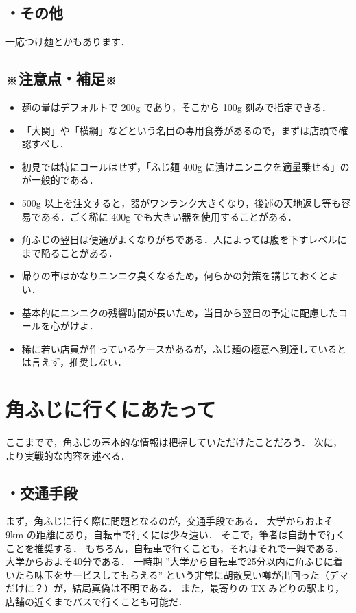 \documentclass[uplatex]{jsarticle}
\begin{document}
  \subsection*{・その他}
  一応つけ麺とかもあります．

  \subsection*{※注意点・補足※}
  \begin{itemize}
   \item 麺の量はデフォルトで 200g であり，そこから 100g 刻みで指定できる．
   \item 「大関」や「横綱」などという名目の専用食券があるので，まずは店頭で確認すべし．
   \item 初見では特にコールはせず，「ふじ麺 400g に漬けニンニクを適量乗せる」のが一般的である．
   \item 500g 以上を注文すると，器がワンランク大きくなり，後述の天地返し等も容易である．ごく稀に 400g でも大きい器を使用することがある．
   \item 角ふじの翌日は便通がよくなりがちである．人によっては腹を下すレベルにまで陥ることがある．
   \item 帰りの車はかなりニンニク臭くなるため，何らかの対策を講じておくとよい．
   \item 基本的にニンニクの残響時間が長いため，当日から翌日の予定に配慮したコールを心がけよ．
   \item 稀に若い店員が作っているケースがあるが，ふじ麺の極意へ到達しているとは言えず，推奨しない．
  \end{itemize}

  \newpage

 \section{角ふじに行くにあたって}
 ここまでで，角ふじの基本的な情報は把握していただけたことだろう．
 次に，より実戦的な内容を述べる．

  \subsection*{・交通手段}
  まず，角ふじに行く際に問題となるのが，交通手段である．
  大学からおよそ 9km の距離にあり，自転車で行くには少々遠い．
  そこで，筆者は自動車で行くことを推奨する．
  もちろん，自転車で行くことも，それはそれで一興である．
  大学からおよそ40分である．
  一時期 ''大学から自転車で25分以内に角ふじに着いたら味玉をサービスしてもらえる'' という非常に胡散臭い噂が出回った（デマだけに？）が，結局真偽は不明である．
  また，最寄りの TX みどりの駅より，店舗の近くまでバスで行くことも可能だ．
\end{document}
